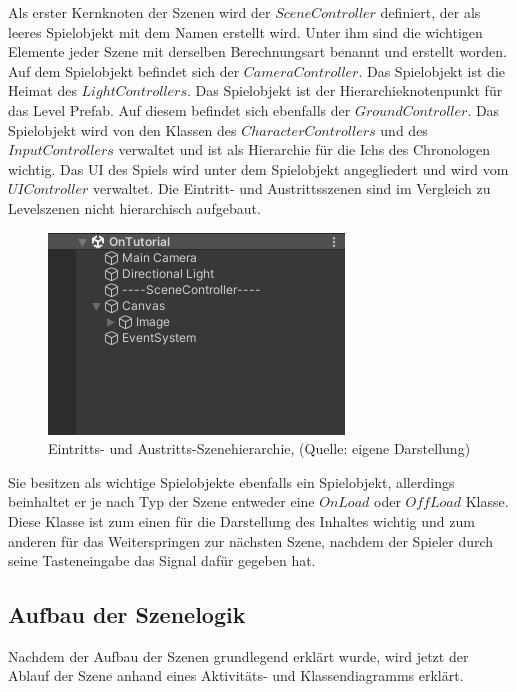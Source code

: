 Als erster Kernknoten der Szenen wird der $SceneController$ definiert, der als leeres Spielobjekt mit dem Namen  erstellt wird. Unter ihm sind die wichtigen Elemente jeder Szene mit derselben Berechnungsart benannt und erstellt worden. Auf dem Spielobjekt  befindet sich der $CameraController$. Das Spielobjekt  ist die Heimat des $LightControllers$. Das Spielobjekt  ist der Hierarchieknotenpunkt für das Level Prefab. Auf diesem befindet sich ebenfalls der $GroundController$. Das Spielobjekt  wird von den Klassen des $CharacterControllers$ und des $InputControllers$ verwaltet und ist als Hierarchie für die Ichs des Chronologen wichtig. Das \ac{UI} des Spiels wird unter dem Spielobjekt  angegliedert und wird vom $UIController$ verwaltet.
\newpage
Die Eintritt- und Austrittsszenen sind im Vergleich zu Levelszenen nicht hierarchisch aufgebaut.

\begin{figure}[ht]
\centering
\includegraphics[width=0.6\linewidth]{content/pictures/Detail_on_off.jpg}
\caption{Eintritts- und Austritts-Szenehierarchie, (Quelle: eigene Darstellung)}
\label{fig:on_of_load_hierachy}
\end{figure}

Sie besitzen als wichtige Spielobjekte ebenfalls ein  Spielobjekt, allerdings beinhaltet er je nach Typ der Szene entweder eine $OnLoad$ oder $OffLoad$ Klasse. Diese Klasse ist zum einen für die Darstellung des Inhaltes wichtig und zum anderen für das Weiterspringen zur nächsten Szene, nachdem der Spieler durch seine Tasteneingabe das Signal dafür gegeben hat.

\subsection{Aufbau der Szenelogik}\label{sec:scene-loop}
Nachdem der Aufbau der Szenen grundlegend erklärt wurde, wird jetzt der Ablauf der Szene anhand eines Aktivitäts- und Klassendiagramms erklärt.

